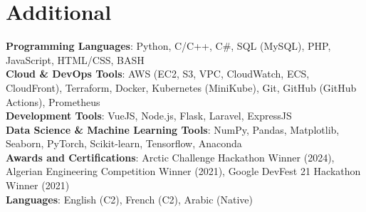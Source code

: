 \documentclass[letterpaper,10.5t]{article}
\begin{document}
%
\section{Additional}
    \begin{itemize}[leftmargin=0.15in, label={}]
        \small{\item{
        \textbf{Programming Languages}{: Python, C/C++, C\#, SQL (MySQL), PHP, JavaScript, HTML/CSS, BASH} \\
        \textbf{Cloud \& DevOps Tools}{: AWS (EC2, S3, VPC, CloudWatch, ECS, CloudFront), Terraform, Docker, Kubernetes (MiniKube), Git, GitHub (GitHub Actions), Prometheus} \\
        \textbf{Development Tools}{: VueJS, Node.js, Flask, Laravel, ExpressJS} \\
        \textbf{Data Science \& Machine Learning Tools}{: NumPy, Pandas, Matplotlib, Seaborn, PyTorch, Scikit-learn, Tensorflow, Anaconda } \\
        \textbf{Awards and Certifications}{: Arctic Challenge Hackathon Winner (2024), Algerian Engineering Competition Winner (2021), Google DevFest 21 Hackathon Winner (2021)}\\
        \textbf{Languages}{: English (C2), French (C2), Arabic (Native)} \\
        }}
    \end{itemize}


\end{document}

